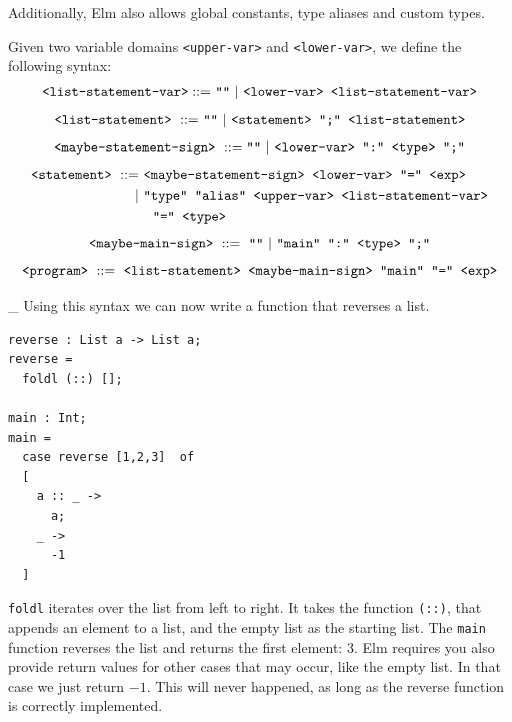 \documentclass[]{scrbook}
\newcommand{\mf}[1]{\text{\texttt{#1}}}
\theoremstyle{definition}
\theoremstyle{definition}
\theoremstyle{definition}
\theoremstyle{remark}
\let\BeginKnitrBlock\begin \let\EndKnitrBlock\end
\begin{document}
Additionally, Elm also allows global constants, type aliases and custom
types.

\BeginKnitrBlock{definition}[Statement Syntax]
\protect\hypertarget{def:unnamed-chunk-26}{}{\label{def:unnamed-chunk-26}
{} }Given two variable domains
\texttt{\textless{}upper-var\textgreater{}} and
\texttt{\textless{}lower-var\textgreater{}}, we define the following
syntax: \[
\begin{aligned}
\mf{<list-statement-var>} ::=& \ \mf{""} \ | \ \mf{<lower-var> <list-statement-var>}\\
\end{aligned}
\] \[
\begin{aligned}
  \mf{<list-statement>} \ ::=& \ \mf{""} \ | \ \mf{<statement> ";" <list-statement>}\\
\end{aligned}
\] \[
\begin{aligned}
  \mf{<maybe-statement-sign>} \ ::= \mf{""} \ | \ \mf{<lower-var> ":" <type> ";"}\\
\end{aligned}
\] \[
\begin{aligned}
\mf{<statement>} \ ::=& \ \mf{<maybe-statement-sign> <lower-var> "=" <exp>}\\
                     |& \ \mf{"type" "alias" <upper-var> <list-statement-var>}\\
                      &\quad\mf{"=" <type>}
\end{aligned}
\]
\[\mf{<maybe-main-sign>} \ ::= \ \mf{""} \ |\ \mf{"main" ":" <type> ";"}\]
\[\mf{<program>} \ ::= \ \mf{<list-statement> <maybe-main-sign> "main" "=" <exp>}\]
\EndKnitrBlock{definition}

\BeginKnitrBlock{myexample}_
\label{ex:reverse_list} Using this syntax we can now write a function
that reverses a list.

\begin{lstlisting}
reverse : List a -> List a;
reverse =
  foldl (::) [];

main : Int;
main =
  case reverse [1,2,3]  of
  [
    a :: _ ->
      a;
    _ ->
      -1
  ]
\end{lstlisting}

\texttt{foldl} iterates over the list from left to right. It takes the
function \texttt{(::)}, that appends an element to a list, and the empty
list as the starting list. The \texttt{main} function reverses the list
and returns the first element: \(3\). Elm requires you also provide
return values for other cases that may occur, like the empty list. In
that case we just return \(-1\). This will never happened, as long as
the reverse function is correctly implemented.
\EndKnitrBlock{myexample}
\end{document}
